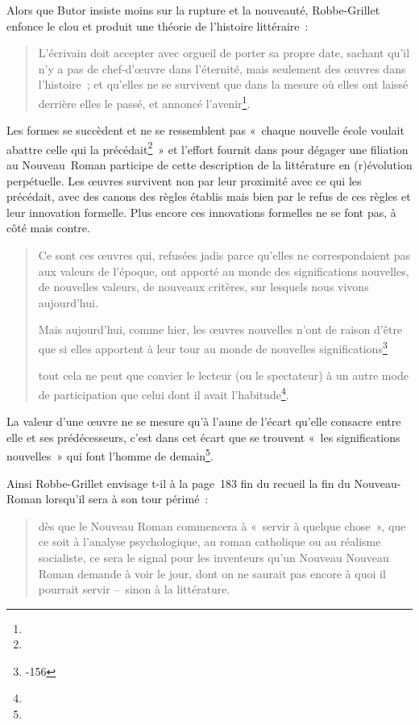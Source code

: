 \documentclass[12pt, a4paper]{article}
\begin{document}
Alors que Butor insiste moins sur la rupture et la nouveauté, Robbe-Grillet enfonce le clou et produit une théorie de l'histoire littéraire~:
\begin{quote}
     L'écrivain doit accepter avec orgueil de porter sa propre date, sachant qu'il n'y a pas de chef-d'œuvre dans l'éternité, mais seulement des œuvres dans l'histoire~; et qu'elles ne se survivent que dans la mesure où elles ont laissé derrière elles le passé, et annoncé l'avenir\footnote{}.
\end{quote}
Les formes se succèdent et ne se ressemblent pas «~chaque nouvelle école voulait abattre celle qui la précédait\footnote{}~» et l'effort fournit dans \punr{} pour dégager une filiation au Nouveau~Roman participe de cette description de la littérature en (r)évolution perpétuelle. Les œuvres survivent non par leur proximité avec ce qui les précédait, avec des canons des règles établis mais bien par le refus de ces règles et leur innovation formelle. Plus encore ces innovations formelles ne se font pas, à côté mais contre.
\begin{quote}
    Ce sont ces œuvres qui, refusées jadis parce qu’elles ne correspondaient pas aux valeurs de l’époque, ont apporté au monde des significations nouvelles, de nouvelles valeurs, de nouveaux critères, sur lesquels nous vivons aujourd’hui.

    Mais aujourd’hui, comme hier, les œuvres nouvelles n’ont de raison d’être que si elles apportent à leur tour au monde de nouvelles significations\footnote{-156}

    tout cela ne peut que convier le lecteur (ou le spectateur) à un autre mode de participation que celui dont il avait l’habitude\footnote{}.
\end{quote}

La valeur d'une œuvre ne se mesure qu'à l'aune de l'écart qu'elle consacre entre elle et ses prédécesseurs, c'est dans cet écart que se trouvent «~les significations nouvelles~» qui font l'homme de demain\footnote{}.

Ainsi Robbe-Grillet envisage t-il à la page~183 fin du recueil la fin du Nouveau-Roman lorsqu'il sera à son tour périmé~:
\begin{quote}
   dès que le Nouveau Roman commencera à «~servir à quelque chose~», que ce soit à l’analyse psychologique, au roman catholique ou au réalisme socialiste, ce sera le signal pour les inventeurs qu’un Nouveau Nouveau Roman demande à voir le jour, dont on ne saurait pas encore à quoi il pourrait servir –~sinon à la littérature.
\end{quote}
\end{document}
